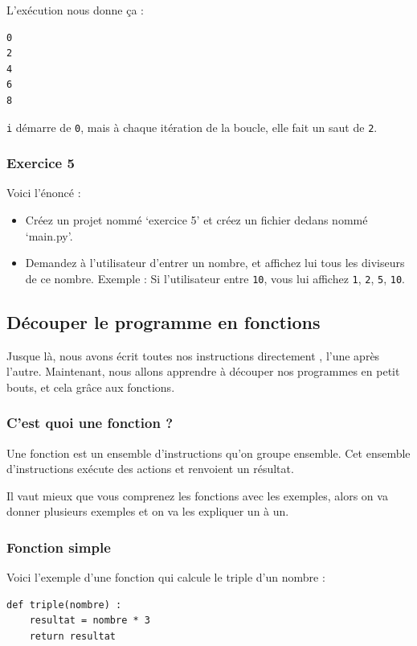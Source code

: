 \documentclass[12pt]{article}
\newcommand{\code}[1]{\colorbox{light-gray}{\texttt{#1}}}
\begin{document}
            L'exécution nous donne ça :
            \begin{lstlisting}[style=exec_result]
0
2
4
6
8
            \end{lstlisting}

            \code{i} démarre de \code{0}, mais à chaque itération de la boucle, elle fait un saut de \code{2}.

        \subsubsection{Exercice 5}
            Voici l'énoncé :
            \begin{itemize}
                \item Créez un projet nommé `exercice 5' et créez un fichier dedans nommé `main.py'.
                \item Demandez à l'utilisateur d'entrer un nombre, et affichez lui tous les diviseurs de ce nombre.
                    Exemple : Si l'utilisateur entre \code{10}, vous lui affichez \code{1}, \code{2}, \code{5}, \code{10}.
            \end{itemize}

\clearpage

    \subsection{Découper le programme en fonctions}
        Jusque là, nous avons écrit toutes nos instructions directement , l'une après l'autre. Maintenant, nous allons
        apprendre à découper nos programmes en petit bouts, et cela grâce aux fonctions.

        \subsubsection{C'est quoi une fonction ?}
            Une fonction est un ensemble d'instructions qu'on groupe ensemble. Cet ensemble d'instructions exécute
            des actions et renvoient un résultat.

            Il vaut mieux que vous comprenez les fonctions avec les exemples, alors on va donner plusieurs exemples
            et on va les expliquer un à un.

        \subsubsection{Fonction simple}

            Voici l'exemple d'une fonction qui calcule le triple d'un nombre :
            \begin{lstlisting}[style=code]
def triple(nombre) :
    resultat = nombre * 3
    return resultat
            \end{lstlisting}
\end{document}
